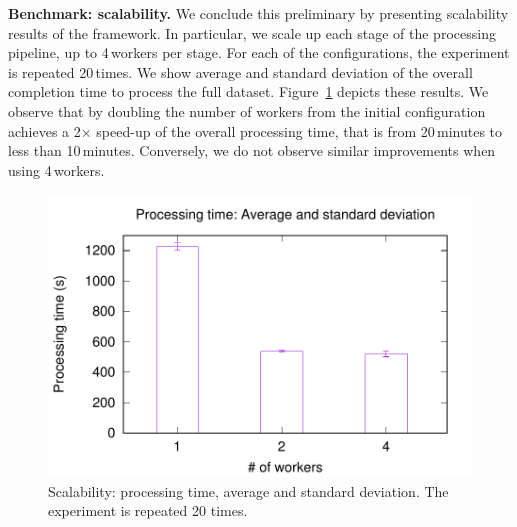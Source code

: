 

\textbf{Benchmark: scalability.} We conclude this preliminary by presenting scalability results of the \SYS framework.
In particular, we scale up each stage of the processing pipeline, up to 4\,workers per stage.
For each of the configurations, the experiment is repeated 20\,times.
We show average and standard deviation of the overall completion time to process the full dataset.
Figure~\ref{fig:scalability} depicts these results.
We observe that by doubling the number of workers from the initial configuration achieves a 2$\times$ speed-up of the overall processing time, that is from 20\,minutes to less than 10\,minutes.
Conversely, we do not observe similar improvements when using 4\,workers.

\begin{figure}[t!]
  \centering
  \includegraphics[scale=0.5]{images/avg_stdev_4_streams}
  \caption{Scalability: processing time, average and standard deviation. The experiment is repeated 20 times.}
  \label{fig:scalability}
\end{figure}

